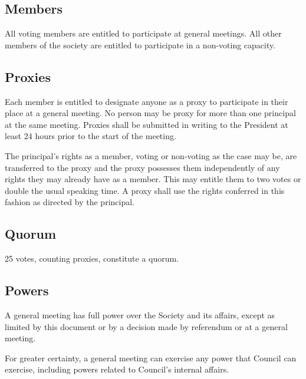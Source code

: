 \subsection{Members}
All voting members are entitled to participate at general meetings. All other
members of the society are entitled to participate in a non-voting capacity.

\subsection{Proxies}
Each member is entitled to designate anyone as a proxy to participate in their
place at a general meeting. No person may be proxy for more than one principal
at the same meeting. Proxies shall be submitted in writing to the President at
least 24 hours prior to the start of the meeting.

The principal's rights as a member, voting or non-voting as the case may be, are
transferred to the proxy and the proxy possesses them independently of any rights
they may already have as a member. This may entitle them to two votes or double
the usual speaking time. A proxy shall use the rights conferred in this fashion
as directed by the principal.

\subsection{Quorum}
25 votes, counting proxies, constitute a quorum.

\subsection{Powers}
A general meeting has full power over the Society and its affairs, except as
limited by this document or by a decision made by referendum or at a general
meeting.

For greater certainty, a general meeting can exercise any power that Council
can exercise, including powers related to Council's internal affairs.
